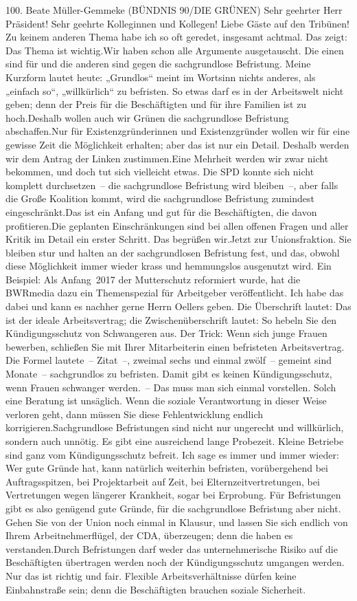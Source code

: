 \documentclass{article}
\begin{document}
	100. Beate Müller-Gemmeke (BÜNDNIS 90/DIE GRÜNEN) Sehr geehrter Herr Präsident! Sehr geehrte Kolleginnen und Kollegen! Liebe Gäste auf den Tribünen! Zu keinem anderen Thema habe ich so oft geredet, insgesamt achtmal. Das zeigt: Das Thema ist wichtig.Wir haben schon alle Argumente ausgetauscht. Die einen sind für und die anderen sind gegen die sachgrundlose Befristung. Meine Kurzform lautet heute: „Grundlos“ meint im Wortsinn nichts anderes, als „einfach so“, „willkürlich“ zu befristen. So etwas darf es in der Arbeitswelt nicht geben; denn der Preis für die Beschäftigten und für ihre Familien ist zu hoch.Deshalb wollen auch wir Grünen die sachgrundlose Befristung abschaffen.Nur für Existenzgründerinnen und Existenzgründer wollen wir für eine gewisse Zeit die Möglichkeit erhalten; aber das ist nur ein Detail. Deshalb werden wir dem Antrag der Linken zustimmen.Eine Mehrheit werden wir zwar nicht bekommen, und doch tut sich vielleicht etwas. Die SPD konnte sich nicht komplett durchsetzen – die sachgrundlose Befristung wird bleiben –, aber falls die Große Koalition kommt, wird die sachgrundlose Befristung zumindest eingeschränkt.Das ist ein Anfang und gut für die Beschäftigten, die davon profitieren.Die geplanten Einschränkungen sind bei allen offenen Fragen und aller Kritik im Detail ein erster Schritt. Das begrüßen wir.Jetzt zur Unionsfraktion. Sie bleiben stur und halten an der sachgrundlosen Befristung fest, und das, obwohl diese Möglichkeit immer wieder krass und hemmungslos ausgenutzt wird. Ein Beispiel: Als Anfang 2017 der Mutterschutz reformiert wurde, hat die BWRmedia dazu ein Themenspezial für Arbeitgeber veröffentlicht. Ich habe das dabei und kann es nachher gerne Herrn Oellers geben. Die Überschrift lautet: Das ist der ideale Arbeitsvertrag; die Zwischenüberschrift lautet: So hebeln Sie den Kündigungsschutz von Schwangeren aus. Der Trick: Wenn sich junge Frauen bewerben, schließen Sie mit Ihrer Mitarbeiterin einen befristeten Arbeitsvertrag. Die Formel lautete – Zitat –, zweimal sechs und einmal zwölf – gemeint sind Monate – sachgrundlos zu befristen. Damit gibt es keinen Kündigungsschutz, wenn Frauen schwanger werden. – Das muss man sich einmal vorstellen. Solch eine Beratung ist unsäglich. Wenn die soziale Verantwortung in dieser Weise verloren geht, dann müssen Sie diese Fehlentwicklung endlich korrigieren.Sachgrundlose Befristungen sind nicht nur ungerecht und willkürlich, sondern auch unnötig. Es gibt eine ausreichend lange Probezeit. Kleine Betriebe sind ganz vom Kündigungsschutz befreit. Ich sage es immer und immer wieder: Wer gute Gründe hat, kann natürlich weiterhin befristen, vorübergehend bei Auftragsspitzen, bei Projektarbeit auf Zeit, bei Elternzeitvertretungen, bei Vertretungen wegen längerer Krankheit, sogar bei Erprobung. Für Befristungen gibt es also genügend gute Gründe, für die sachgrundlose Befristung aber nicht. Gehen Sie von der Union noch einmal in Klausur, und lassen Sie sich endlich von Ihrem Arbeitnehmerflügel, der CDA, überzeugen; denn die haben es verstanden.Durch Befristungen darf weder das unternehmerische Risiko auf die Beschäftigten übertragen werden noch der Kündigungsschutz umgangen werden. Nur das ist richtig und fair. Flexible Arbeitsverhältnisse dürfen keine Einbahnstraße sein; denn die Beschäftigten brauchen soziale Sicherheit. 
\end{document}
